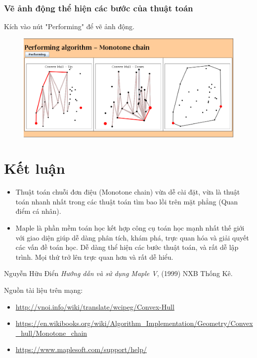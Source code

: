 \documentclass[12pt]{article}
\begin{document}
        \subsubsection{Vẽ ảnh động thể hiện các bước của thuật toán}
          Kích vào nút "Performing" để vẽ ảnh động.
          \begin{figure}[h]
            \includegraphics[scale=0.4]{Image/ani}
          \end{figure}
    \section{Kết luận}
    \begin{itemize}
      \item Thuật toán chuỗi đơn điệu (Monotone chain) vừa dễ cài đặt, vừa là thuật toán nhanh nhất trong các thuật toán tìm bao lồi trên mặt phẳng (Quan điểm cá nhân). 
      \item Maple là phần mềm toán học kết hợp công cụ toán học mạnh nhất thế giới với giao diện giúp dễ dàng phân tích, khám phá, trực quan hóa và giải quyết các vấn đề toán học.
      Dễ dàng thể hiện các bước thuật toán, và rất dễ lập trình.
      Mọi thứ trở lên trực quan hơn và rất dễ hiểu.
    \end{itemize}
    
\newpage
\begin{thebibliography}{99}
%

 Nguyễn Hữu Điển
\textit{Hướng dẫn và sử dụng Maple V},  (1999) NXB Thống Kê.

Nguồn tài liệu trên mạng:  
\begin{itemize}
  \item \url{http://vnoi.info/wiki/translate/wcipeg/Convex-Hull}
  \item \url{https://en.wikibooks.org/wiki/Algorithm_Implementation/Geometry/Convex_hull/Monotone_chain}
  \item \url{https://www.maplesoft.com/support/help/}
\end{itemize}
\end{thebibliography}
\end{document}
